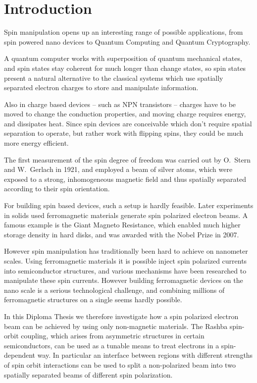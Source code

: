 \chapter{Introduction}

Spin manipulation opens up an interesting range of possible applications, from
spin powered nano devices to Quantum Computing and Quantum Cryptography.

A quantum computer works with superposition of quantum mechanical states, and
spin states stay coherent for much longer than change states, so spin states
present a natural alternative to the classical systems which use spatially
separated electron charges to store and manipulate information.

Also in charge based devices -- such as NPN transistors -- charges have to be
moved to change the conduction properties, and moving charge requires energy,
and dissipates heat. Since spin devices are conceivable which don't require
spatial separation to operate, but rather work with flipping spins, they could
be much more energy efficient.

The first measurement of the spin degree of freedom was carried out by O.~Stern
and W.~Gerlach in 1921\cite{stern-gerlach}, and employed a beam of silver atoms,
which were
exposed to a strong, inhomogeneous magnetic field and thus spatially separated
according to their spin orientation.

For building spin based devices, such a setup is hardly feasible. Later
experiments in solids used ferromagnetic materials generate spin polarized
electron beams. A famous example is the Giant Magneto Resistance, which
enabled much higher storage density in hard disks, and was awarded with the
Nobel Prize in 2007.

However spin manipulation has traditionally been hard to achieve on nanometer
scales. Using ferromagnetic materials it is possible inject spin polarized
currents into semiconductor structures, and various mechanisms have been
researched to manipulate these spin currents.
However building ferromagnetic devices on
the nano scale is a serious technological challenge, and combining millions of
ferromagnetic structures on a single seems hardly possible.

In this Diploma Thesis we therefore investigate how a spin polarized electron
beam can be achieved by using only non-magnetic materials. The Rashba 
spin-orbit coupling, which arises from
asymmetric structures in certain semiconductors, can be used as a tunable
means to treat
electrons in a spin-dependent way. In particular an interface
between regions with different strengths of spin orbit interactions can be
used to split a non-polarized beam into two spatially separated beams of
different spin polarization.

